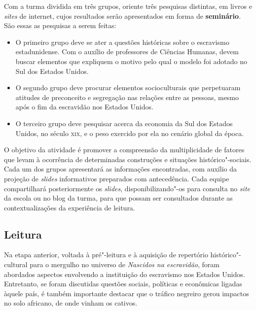 \documentclass[11pt]{extarticle}
\begin{document}

Com a turma dividida em três grupos, oriente três pesquisas distintas,
em livros e \emph{sites} de internet, cujos resultados serão
apresentados em forma de \textbf{seminário}. São essas as pesquisas a
serem feitas:

\begin{itemize}
\item
  O primeiro grupo deve se ater a questões históricas sobre o escravismo
  estadunidense. Com o auxílio de professores de Ciências Humanas, devem
  buscar elementos que expliquem o motivo pelo qual o modelo foi adotado
  no Sul dos Estados Unidos.
\item
  O segundo grupo deve procurar elementos socioculturais que perpetuaram
  atitudes de preconceito e segregação nas relações entre as pessoas,
  mesmo após o fim da escravidão nos Estados Unidos.
\item
  O terceiro grupo deve pesquisar acerca da economia da Sul dos Estados
  Unidos, no século \textsc{xix}, e o peso exercido por ela no cenário global da
  época.
\end{itemize}

O objetivo da atividade é promover a compreensão da multiplicidade de
fatores que levam à ocorrência de determinadas construções e situações
histórico"-sociais. Cada um dos grupos apresentará as informações
encontradas, com auxílio da projeção de \emph{slides} informativos
preparados com antecedência. Cada equipe compartilhará posteriormente os
\emph{slides}, disponibilizando"-os para consulta no \emph{site} da
escola ou no blog da turma, para que possam ser consultados durante as
contextualizações da experiência de leitura.

\subsection{Leitura}

Na etapa anterior, voltada à pré"-leitura e à aquisição de
repertório histórico"-cultural para o mergulho no universo de
\emph{Nascidos na escravidão}, foram abordados aspectos envolvendo a
instituição do escravismo nos Estados Unidos. Entretanto, se foram
discutidas questões sociais, políticas e econômicas ligadas àquele país,
é também importante destacar que o tráfico negreiro gerou impactos no
solo africano, de onde vinham os cativos.
\end{document}
